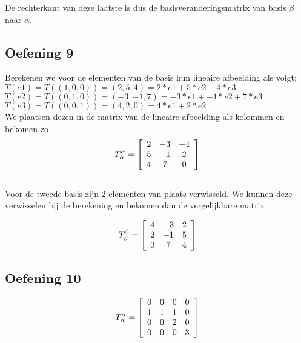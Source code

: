 \documentclass[lineaire_algebra_oplossingen.tex]{subfiles}
\begin{document}
De rechterkant van deze laatste is dus de basisveranderingsmatrix van basis $\beta$ naar $\alpha$.

\subsection{Oefening 9}

Berekenen we voor de elementen van de basis hun lineaire afbeelding als volgt:\\

$T(e1) = T( (1,0,0) ) = (2,5,4) = 2 * e1 + 5 * e2 + 4 * e3$\\

$T(e2) = T( (0,1,0) ) = (-3,-1,7) = -3 * e1 + -1 * e2 + 7 * e3$\\

$T(e3) = T( (0,0,1) ) = (4,2,0) = 4 * e1 + 2 * e2$\\

We plaatsen dezen in de matrix van de lineaire afbeelding als kolommen en bekomen zo\\

\[
T^{\alpha}_{\alpha} =
\left[
\begin{array}{c c c}
2 & -3 & -4\\
5 & -1 & 2\\
4 & 7 & 0
\end{array}
\right]
\]\\

Voor de tweede basis zijn 2 elementen van plaats verwisseld. We kunnen deze verwisselen bij de berekening en bekomen dan de vergelijkbare matrix

\[
T^{\beta}_{\beta} =
\left[
\begin{array}{c c c}
4 & -3 & 2\\
2 & -1 & 5\\
0 & 7 & 4
\end{array}
\right]
\]


\subsection{Oefening 10}

\[
T^{\alpha}_{\alpha} =
\left[
\begin{array}{c c c c}
0 & 0 & 0 & 0\\
1 & 1 & 1 & 0\\
0 & 0 & 2 & 0\\
0 & 0 & 0 & 3
\end{array}
\right]
\]\\
\end{document}
